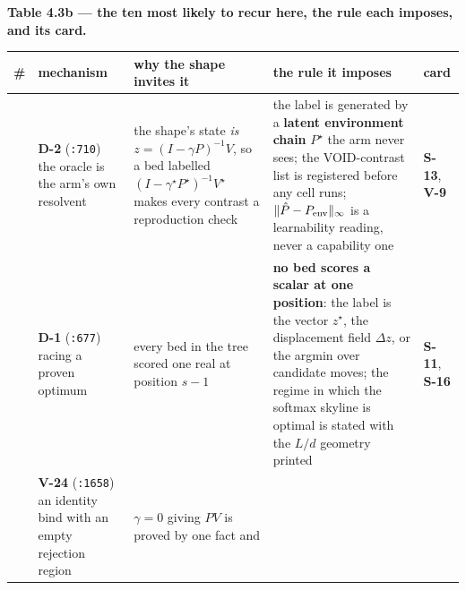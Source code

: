 \documentclass[11pt,a4paper]{article}
\newcounter{none}                 %
\theoremstyle{plain}
\theoremstyle{definition}
\theoremstyle{remark}
\begin{document}
\textbf{Table 4.3b --- the ten most likely to recur here, the rule each
imposes, and its card.}

{\def\LTcaptype{none} %
\begin{longtable}[]{@{}
  >{\raggedright\arraybackslash}p{}
  >{\raggedright\arraybackslash}p{}
  >{\raggedright\arraybackslash}p{}
  >{\raggedright\arraybackslash}p{}
  >{\raggedright\arraybackslash}p{}@{}}
\toprule\noalign{}
\begin{minipage}[b]{\linewidth}\raggedright
\#
\end{minipage} & \begin{minipage}[b]{\linewidth}\raggedright
mechanism
\end{minipage} & \begin{minipage}[b]{\linewidth}\raggedright
why the shape invites it
\end{minipage} & \begin{minipage}[b]{\linewidth}\raggedright
the rule it imposes
\end{minipage} & \begin{minipage}[b]{\linewidth}\raggedright
card
\end{minipage} \\
\midrule\noalign{}
\endhead
\bottomrule\noalign{}
\endlastfoot
1 & \textbf{D-2} (\texttt{:710}) the oracle is the arm's own resolvent &
the shape's state \emph{is} \(z=(I-\gamma P)^{-1}V\), so a bed labelled
\((I-\gamma^\star P^\star)^{-1}V^\star\) makes every contrast a
reproduction check & the label is generated by a \textbf{latent
environment chain} \(P^\star\) the arm never sees; the VOID-contrast
list is registered before any cell runs;
\(\lVert\hat P-P_{\rm env}\rVert_\infty\) is a learnability reading,
never a capability one & \textbf{S-13}, \textbf{V-9} \\
2 & \textbf{D-1} (\texttt{:677}) racing a proven optimum & every bed in
the tree scored one real at position \(s-1\) & \textbf{no bed scores a
scalar at one position}: the label is the vector \(z^\star\), the
displacement field \(\Delta z\), or the argmin over candidate moves; the
regime in which the softmax skyline is optimal is stated with the
\(L/d\) geometry printed & \textbf{S-11}, \textbf{S-16} \\
3 & \textbf{V-24} (\texttt{:1658}) an identity bind with an empty
rejection region & \(\gamma=0\) giving \(PV\) is proved by one fact and

\end{longtable}}
\end{document}
